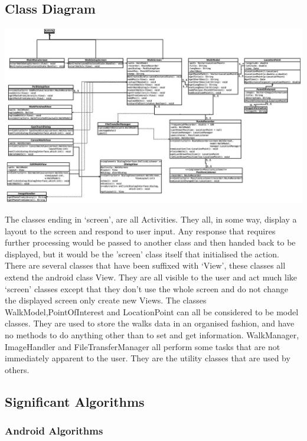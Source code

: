\documentclass[12pt]{article}
\begin{document}
\subsection{Class Diagram}
\begin{landscape}
\begin{adjustwidth}{0.5cm}{2cm}
\includegraphics[scale=2.74253]{Design/class_diagram_new.jpg}
\end{adjustwidth}
\end{landscape}
\restoregeometry
The classes ending in ‘screen’, are all Activities. They all, in some way, display a layout to the screen and respond to user input. Any response that requires further processing would be passed to another class and then handed back to be displayed, but it would be the ’screen’ class itself that initialised the action.  
There are several classes that have been suffixed with ‘View’, these classes all extend the android class View. They are all visible to the user and act much like ‘screen’ classes except that they don’t use the whole screen and do not change the displayed screen only create new Views.  
The classes WalkModel,PointOfInterest and LocationPoint can all be considered to be model classes. They are used to store the walks data in an organised fashion, and have no methods to do anything other than to set and get information.  
WalkManager, ImageHandler and FileTransferManager all perform some tasks that are not immediately apparent to the user. They are the utility classes that are used by others.
\subsection{Significant Algorithms}
\subsubsection{Android Algorithms}
\end{document}
